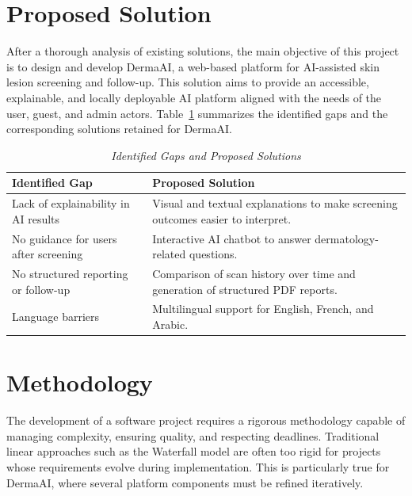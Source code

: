 	\section{Proposed Solution}
	
	After a thorough analysis of existing solutions, the main objective of this project is to
	design and develop DermaAI, a web-based platform for AI-assisted skin lesion screening
	and follow-up. This solution aims to provide an accessible, explainable, and locally
	deployable AI platform aligned with the needs of the user, guest, and admin actors.
	Table~\ref{tab:objectives} summarizes the identified gaps and the corresponding
	solutions retained for DermaAI.
	
	\begin{table}[H]
	\centering
	
	\renewcommand{\arraystretch}{1.4}
	\begin{tabular}{|p{5.5cm}|p{7.5cm}|}
	\hline
	\rowcolor[HTML]{1F3864}
	{\color{white}\textbf{Identified Gap}} &
	{\color{white}\textbf{Proposed Solution}} \\
	\hline
	Lack of explainability in AI results &
	  Visual and textual explanations to make screening outcomes easier to interpret. \\
	\hline
	No guidance for users after screening &
	  Interactive AI chatbot to answer dermatology-related questions. \\
	\hline
	No structured reporting or follow-up &
	  Comparison of scan history over time and generation of structured PDF reports.\\
	\hline
	Language barriers &
	  Multilingual support for English, French, and Arabic. \\\hline
	\end{tabular}
	\caption{\textit{Identified Gaps and Proposed Solutions}}
	\label{tab:objectives}
	\end{table}
	
	\section{Methodology}
	
	The development of a software project requires a rigorous methodology capable of managing
	complexity, ensuring quality, and respecting deadlines. Traditional linear approaches such
	as the Waterfall model are often too rigid for projects whose requirements evolve during
	implementation. This is particularly true for DermaAI, where several platform components
	must be refined iteratively.
	
